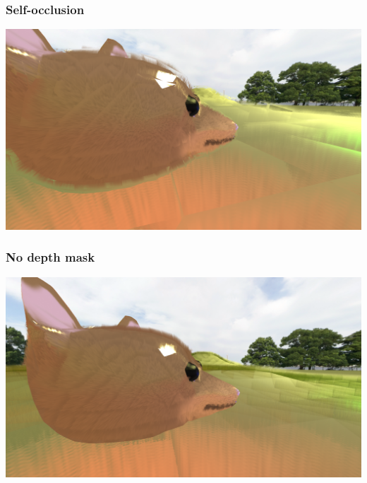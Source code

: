 \documentclass[12pt]{beamer}
\begin{document}
    \begin{frame}
        \frametitle{Self-occlusion}

        \includegraphics[width=\textwidth]{selfocclusiongalore}
    \end{frame}
    \begin{frame}
        \frametitle{No depth mask}

        \includegraphics[width=\textwidth]{selfoccnodepthmask}
    \end{frame}
\end{document}

